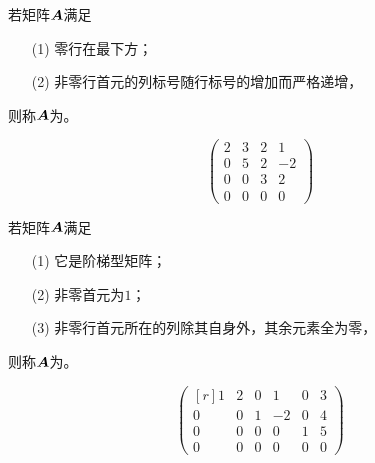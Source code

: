 \begin{frame}{\secname}
  
  \begin{definition}[阶梯型矩阵]
    若矩阵${\boldsymbol{A}}$满足
    \begin{itemize}
    \item[(1)] 零行在最下方；
    \item[(2)] 非零行首元的列标号随行标号的增加而严格递增，
    \end{itemize}
    则称${\boldsymbol{A}}$为。
  \end{definition}
  \begin{example}
    $$
    \left(
    \begin{array}{rrrr}
      2&3&2&1\\
      0&5&2&-2\\
      0&0&3&2\\
      0&0&0&0
    \end{array}
    \right)
    $$
  \end{example}
  
\end{frame}


\begin{frame}{\secname}
  
  \begin{definition}[行简化阶梯型矩阵]
    若矩阵${\boldsymbol{A}}$满足
    \begin{itemize}
    \item[(1)] 它是阶梯型矩阵；
    \item[(2)] 非零首元为$1$；
    \item[(3)] 非零行首元所在的列除其自身外，其余元素全为零，
    \end{itemize}
    则称${\boldsymbol{A}}$为。
  \end{definition}
  \begin{example}
    $$
    \begin{pmatrix*}[r]
      1&2&0& 1&0&3\\
      0&0&1&-2&0&4\\
      0&0&0& 0&1&5\\
      0&0&0& 0&0&0
    \end{pmatrix*}
    $$
  \end{example}
  
\end{frame}


